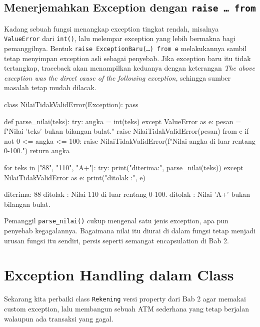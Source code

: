 \subsection{Menerjemahkan Exception dengan \texttt{raise \ldots\ from}}

Kadang sebuah fungsi menangkap exception tingkat rendah, misalnya \texttt{ValueError} dari \texttt{int()}, lalu melempar exception yang lebih bermakna bagi pemanggilnya. Bentuk \texttt{raise ExceptionBaru(\ldots) from e} melakukannya sambil tetap menyimpan exception asli sebagai penyebab. Jika exception baru itu tidak tertangkap, traceback akan menampilkan keduanya dengan keterangan \emph{The above exception was the direct cause of the following exception}, sehingga sumber masalah tetap mudah dilacak.

\begin{kode}
class NilaiTidakValidError(Exception):
    pass

def parse_nilai(teks):
    try:
        angka = int(teks)
    except ValueError as e:
        pesan = f"Nilai '{teks}' bukan bilangan bulat."
        raise NilaiTidakValidError(pesan) from e
    if not 0 <= angka <= 100:
        raise NilaiTidakValidError(f"Nilai {angka} di luar rentang 0-100.")
    return angka

for teks in ["88", "110", "A+"]:
    try:
        print("diterima:", parse_nilai(teks))
    except NilaiTidakValidError as e:
        print("ditolak :", e)
\end{kode}

\begin{keluaran}
diterima: 88
ditolak : Nilai 110 di luar rentang 0-100.
ditolak : Nilai 'A+' bukan bilangan bulat.
\end{keluaran}

Pemanggil \texttt{parse\_nilai()} cukup mengenal satu jenis exception, apa pun penyebab kegagalannya. Bagaimana nilai itu diurai di dalam fungsi tetap menjadi urusan fungsi itu sendiri, persis seperti semangat encapsulation di Bab 2.

\section{Exception Handling dalam Class}

Sekarang kita perbaiki class \texttt{Rekening} versi property dari Bab 2 agar memakai custom exception, lalu membangun sebuah ATM sederhana yang tetap berjalan walaupun ada transaksi yang gagal.

